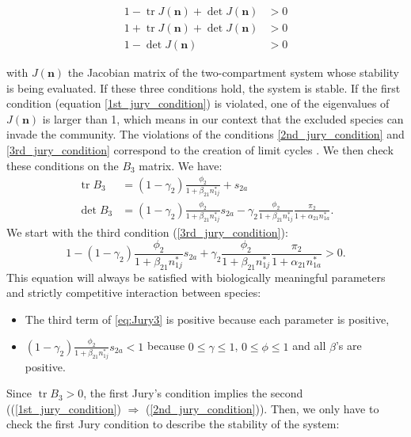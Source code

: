 \documentclass{article}
\DeclareMathOperator{\tr}{tr}
\begin{document}
\begin{align}
1- \tr J(\mathbf{n})+\det J(\mathbf{n}) &>0\label{1st_jury_condition}\\ 
1+ \tr J(\mathbf{n}) + \det J(\mathbf{n}) &> 0 \label{2nd_jury_condition}\\
1- \det J(\mathbf{n}) &> 0 \label{3rd_jury_condition}
\end{align}

with $J(\mathbf{n})$ the Jacobian matrix of the two-compartment system whose stability is being evaluated. If these three conditions hold, the system is stable. If the first condition (equation \eqref{1st_jury_condition}) is violated, one of the eigenvalues of $J(\mathbf{n})$ is larger than 1, which means in our context that the excluded species can invade the community. The violations of the conditions \eqref{2nd_jury_condition} and \eqref{3rd_jury_condition} correspond to the creation of limit cycles \citep{neubert2000density}. We then check these conditions on the $B_3$ matrix. We have:
\begin{align*}
    \tr B_3 &= (1-\gamma_2)\frac{\phi_2}{1+\beta_{21}n_{1j}^*} + s_{2a} \\
    \det B_3 &= (1-\gamma_2)\frac{\phi_2}{1+\beta_{21}n_{1j}^*}s_{2a} - \gamma_2\frac{\phi_2}{1+\beta_{21}n_{1j}^*}\frac{\pi_2}{1+\alpha_{21}n_{1a}^*}.
\end{align*}
We start with the third condition (\ref{3rd_jury_condition}):
\begin{equation}\label{eq:Jury3}
    1- (1-\gamma_2)\frac{\phi_2}{1+\beta_{21}n_{1j}^*}s_{2a} + \gamma_2\frac{\phi_2}{1+\beta_{21}n_{1j}^*}\frac{\pi_2}{1+\alpha_{21}n_{1a}^*} > 0.
\end{equation}
This equation will always be satisfied with biologically meaningful parameters and strictly competitive interaction between species: 
\begin{itemize}
    \item The third term of \eqref{eq:Jury3} is positive because each parameter is positive,
    \item $(1-\gamma_2)\frac{\phi_2}{1+\beta_{21}n_{1j}^*}s_{2a} < 1$ because $0 \leq \gamma \leq 1$, $0 \leq \phi \leq 1$ and all $\beta$'s are positive.
\end{itemize}

Since $\tr B_3 > 0$, the first Jury's condition implies the second ((\ref{1st_jury_condition}) $\Rightarrow$ (\ref{2nd_jury_condition})). Then, we only have to check the first Jury condition to describe the stability of the system:
\end{document}
